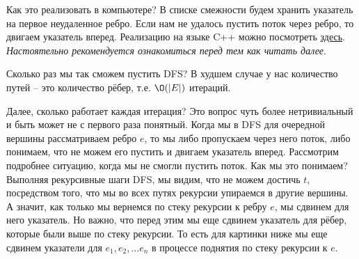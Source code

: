 Как это реализовать в компьютере? В списке смежности будем хранить указатель на первое неудаленное ребро. Если нам не удалось пустить поток через ребро, то двигаем указатель вперед.
Реализацию на языке C++ можно посмотреть \href{https://wiki.algocode.ru/index.php?title=Алгоритмы_поиска_блокирующего_потока}{здесь}. \textit{Настоятельно рекомендуется ознакомиться перед тем как читать далее}.

Сколько раз мы так сможем пустить DFS? В худшем случае у нас количество путей -- это количество рёбер, т.е. $\O(|E|)$ итераций.

Далее, сколько работает каждая итерация? Это вопрос чуть более нетривиальный и быть может не с первого раза понятный. Когда мы в DFS для очередной вершины рассматриваем ребро $e$, то мы либо пропускаем через него поток, либо понимаем, что не можем его пустить и двигаем указатель вперед. Рассмотрим подробнее ситуацию, когда мы не смогли пустить поток.
Как мы это понимаем? Выполняя рекурсивные шаги DFS, мы видим, что не можем достичь $t$, посредством того, что мы во всех путях рекурсии упираемся в другие вершины. А значит, как только мы вернемся по стеку рекурсии к ребру $e$, мы сдвинем для него указатель. 
Но важно, что перед этим мы еще сдвинем указатель для рёбер, которые были выше по стеку рекурсии. То есть для картинки ниже мы еще сдвинем указатели для $e_1, e_2, \dots e_n$ в процессе поднятия по стеку рекурсии к $e$.

\begin{figure}[h]
    \centering
    
\end{figure}

